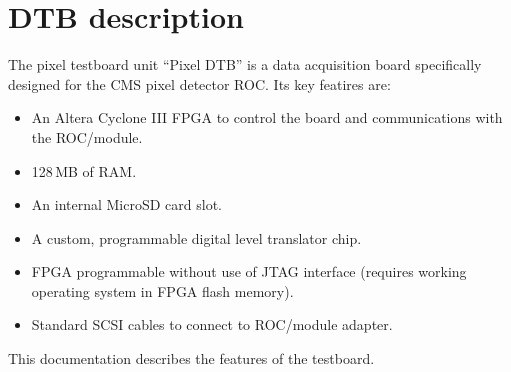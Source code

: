 \chapter{DTB description}

The pixel testboard unit \enquote{Pixel DTB} is a data acquisition board specifically designed for the CMS pixel detector \gls{ROC}. Its key featires are:
\begin{itemize}
    \item An Altera Cyclone III FPGA to control the board and communications with the \gls{ROC}/module.
    \item 128\,MB of RAM.
    \item An internal MicroSD card slot.
    \item A custom, programmable digital level translator chip.
    \item FPGA programmable without use of JTAG interface (requires working operating system in FPGA flash memory).
    \item Standard SCSI cables to connect to \gls{ROC}/module adapter.
\end{itemize}
This documentation describes the features of the testboard.

%
%

